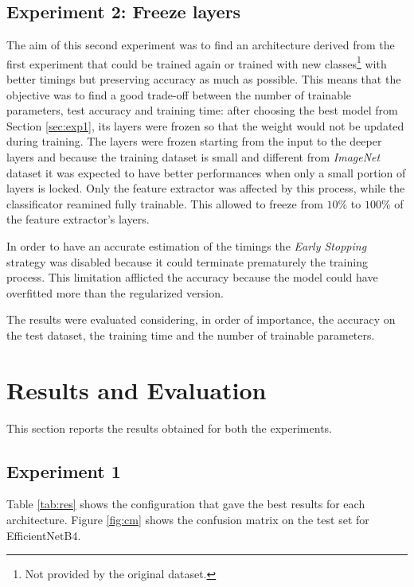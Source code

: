 \subsection{Experiment 2: Freeze layers}\label{sec:exp2}
The aim of this second experiment was to find an architecture derived from the first experiment that could be trained again or trained with new classes\footnote{Not provided by the original dataset.} with better timings but preserving accuracy as much as possible.
This means that the objective was to find a good trade-off between the number of trainable parameters, test accuracy and training time: after choosing the best model from Section \ref{sec:exp1}, its layers were frozen so that the weight would not be updated during training. The layers were frozen starting from the input to the deeper layers and because the training dataset is small and different from \textit{ImageNet} dataset it was expected to have better performances when only a small portion of layers is locked. Only the feature extractor was affected by this process, while the classificator reamined fully trainable. This allowed to freeze from $10\%$ to $100\%$ of the feature extractor's layers.\par
In order to have an accurate estimation of the timings the \textit{Early Stopping} strategy was disabled because it could terminate prematurely the training process. This limitation afflicted the accuracy because the model could have overfitted more than the regularized version.
\par
The results were evaluated considering, in order of importance,  the accuracy on the test dataset, the training time and the number of trainable parameters. 





\section{Results and Evaluation}
This section reports the results obtained for both the experiments. 


\subsection{Experiment 1}

Table \ref{tab:res} shows the configuration that gave the best results for
 each architecture. Figure \ref{fig:cm} shows the confusion matrix on the test set for EfficientNetB4.

